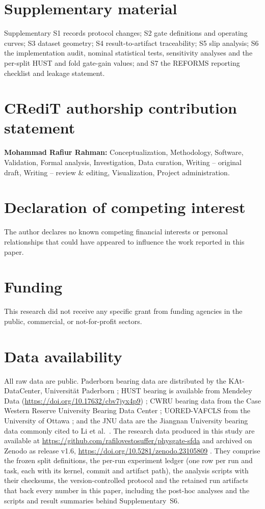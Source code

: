 \section*{Supplementary material}
Supplementary S1 records protocol changes; S2 gate definitions and operating curves; S3 dataset geometry; S4 result-to-artifact traceability; S5 slip analysis; S6 the implementation audit, nominal statistical tests, sensitivity analyses and the per-split HUST and fold gate-gain values; and S7 the REFORMS reporting checklist and leakage statement.

\section*{CRediT authorship contribution statement}
\textbf{Mohammad Rafiur Rahman:} Conceptualization, Methodology, Software, Validation, Formal analysis, Investigation,
Data curation, Writing -- original draft, Writing -- review \& editing, Visualization, Project administration.

\section*{Declaration of competing interest}

The author declares no known competing financial interests or personal relationships that could have
appeared to influence the work reported in this paper.

\section*{Funding}
This research did not receive any specific grant from funding agencies in the public, commercial, or not-for-profit
sectors.

\section*{Data availability}

All raw data are public. Paderborn bearing data are distributed by the KAt-DataCenter, Universit\"at Paderborn
\cite{lessmeier2016}; HUST bearing is available from Mendeley Data (\url{https://doi.org/10.17632/cbv7jyx4p9})
\cite{thuan2023hust}; CWRU bearing data from the Case Western Reserve University Bearing Data Center \cite{cwrubdc};
UORED-VAFCLS from the University of Ottawa \cite{sehri2023uored}; and the JNU data are the Jiangnan University bearing data
commonly cited to Li et al.\ \cite{li2013jnu}.
The research data produced in this study are available at \url{https://github.com/rafilovestosuffer/physgate-sfda} and archived
on Zenodo as release v1.6, \url{https://doi.org/10.5281/zenodo.23105809} \cite{rahman2026physgate}.
They comprise the frozen split definitions, the per-run experiment ledger (one row per run and task, each with its kernel,
commit and artifact path), the analysis scripts with their checksums, the version-controlled protocol and the retained run
artifacts that back every number in this paper, including the post-hoc analyses and the scripts and result summaries behind Supplementary~S6.

